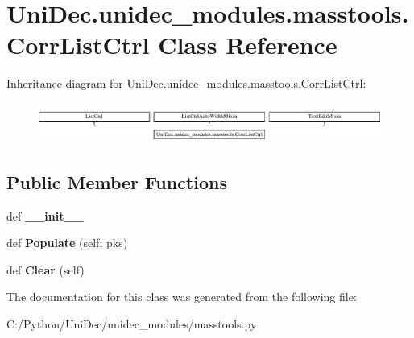 \hypertarget{class_uni_dec_1_1unidec__modules_1_1masstools_1_1_corr_list_ctrl}{}\section{Uni\+Dec.\+unidec\+\_\+modules.\+masstools.\+Corr\+List\+Ctrl Class Reference}
\label{class_uni_dec_1_1unidec__modules_1_1masstools_1_1_corr_list_ctrl}
Inheritance diagram for Uni\+Dec.\+unidec\+\_\+modules.\+masstools.\+Corr\+List\+Ctrl\+:\begin{figure}[H]
\begin{center}
\leavevmode
\includegraphics[height=1.319199cm]{class_uni_dec_1_1unidec__modules_1_1masstools_1_1_corr_list_ctrl}
\end{center}
\end{figure}
\subsection*{Public Member Functions}
\begin{DoxyCompactItemize}
\item 
\hypertarget{class_uni_dec_1_1unidec__modules_1_1masstools_1_1_corr_list_ctrl_abd383372eb5b34663e9000e2055e7442}{}def {\bfseries \+\_\+\+\_\+init\+\_\+\+\_\+}\label{class_uni_dec_1_1unidec__modules_1_1masstools_1_1_corr_list_ctrl_abd383372eb5b34663e9000e2055e7442}

\item 
\hypertarget{class_uni_dec_1_1unidec__modules_1_1masstools_1_1_corr_list_ctrl_ab2ea18a61d38ee83863f6b3ccae7b023}{}def {\bfseries Populate} (self, pks)\label{class_uni_dec_1_1unidec__modules_1_1masstools_1_1_corr_list_ctrl_ab2ea18a61d38ee83863f6b3ccae7b023}

\item 
\hypertarget{class_uni_dec_1_1unidec__modules_1_1masstools_1_1_corr_list_ctrl_af8532694f0ce987ebac33f4ffa187a8c}{}def {\bfseries Clear} (self)\label{class_uni_dec_1_1unidec__modules_1_1masstools_1_1_corr_list_ctrl_af8532694f0ce987ebac33f4ffa187a8c}

\end{DoxyCompactItemize}


The documentation for this class was generated from the following file\+:\begin{DoxyCompactItemize}
\item 
C\+:/\+Python/\+Uni\+Dec/unidec\+\_\+modules/masstools.\+py\end{DoxyCompactItemize}
